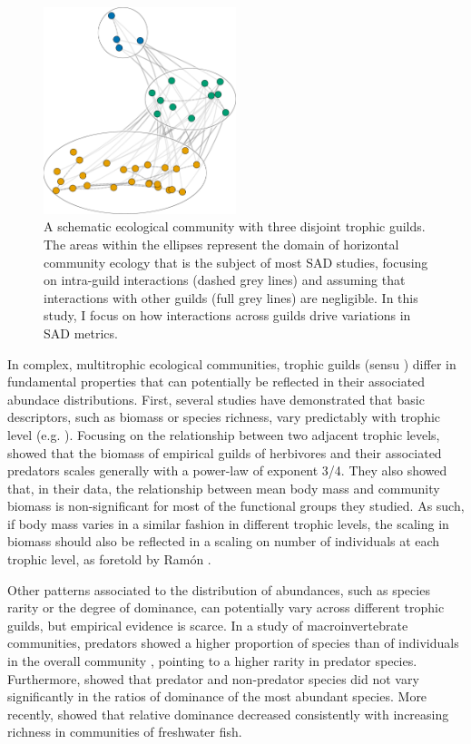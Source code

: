 \begin{figure}[ht!]
\centering
\includegraphics[width=0.5\textwidth,height=\textheight,keepaspectratio]{./Figures/chapter04/Fig_1.png}
\caption[Schematic multi-trophic community]{\color{Gray}A schematic ecological community with three disjoint trophic guilds. The areas within the ellipses represent the domain of horizontal community ecology that is the subject of most SAD studies, focusing on intra-guild interactions (dashed grey lines) and assuming that interactions with other guilds (full grey lines) are negligible. In this study, I focus on how interactions across guilds drive variations in SAD metrics.}\label{fig:fig4.1}
\end{figure}

In complex, multitrophic ecological communities, trophic guilds (sensu \citealt{Fauth1996}) differ in fundamental properties that can potentially be reflected in their associated abundace distributions. First, several studies have demonstrated that basic descriptors, such as biomass or species richness, vary predictably with trophic level (e.g. \citealt{Lindeman1942,Odum1957,Turney2016}). Focusing on the relationship between two adjacent trophic levels, \cite{Hatton2015} showed that the biomass of empirical guilds of herbivores and their associated predators scales generally with a power-law of exponent 3/4. They also showed that, in their data, the relationship between mean body mass and community biomass is non-significant for most of the functional groups they studied. As such, if body mass varies in a similar fashion in different trophic levels, the scaling in biomass should also be reflected in a scaling on number of individuals at each trophic level, as foretold by Ramón \cite{Margalef1980}.

Other patterns associated to the distribution of abundances, such as species rarity or the degree of dominance, can potentially vary across different trophic guilds, but empirical evidence is scarce. In a study of macroinvertebrate communities, predators showed a higher proportion of species than of individuals in the overall community \citep{Spencer2000}, pointing to a higher rarity in predator species. Furthermore, \cite{Spencer2000} showed that predator and non-predator species did not vary significantly in the ratios of dominance of the most abundant species. More recently, \cite{Dornelas2011} showed that relative dominance decreased consistently with increasing richness in communities of freshwater fish.

